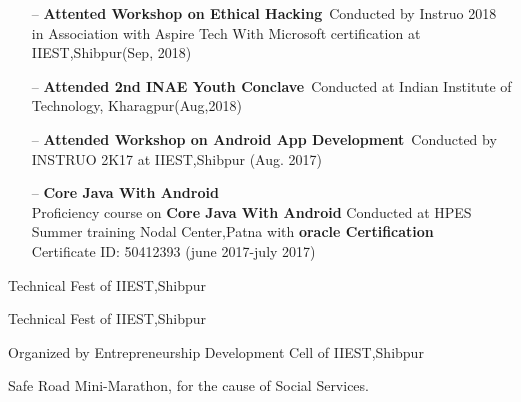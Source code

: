 
\begin{itemize}
    \item[--] \textbf{Attented Workshop on Ethical Hacking} \,Conducted by Instruo 2018 in Association with Aspire Tech With Microsoft certification  at IIEST,Shibpur(Sep, 2018)
    
    \item[--] \textbf{Attended \textbf{2nd INAE Youth Conclave}} 
    \,Conducted at Indian Institute of Technology, Kharagpur(Aug,2018)
    
    
    \item[--] \textbf{Attended Workshop on \textbf{Android App Development}}
     \,Conducted by INSTRUO 2K17 at IIEST,Shibpur (Aug. 2017)
    
    \item[--] \textbf{Core Java With Android} 
    \\Proficiency course on \textbf{Core Java With Android }Conducted at HPES Summer training Nodal Center,Patna with \textbf{oracle Certification}\\Certificate ID: 50412393 (june 2017-july 2017)
    
  
    
    
\end{itemize}





Technical Fest of IIEST,Shibpur


\divider


Technical Fest of IIEST,Shibpur


\divider


Organized by Entrepreneurship Development Cell of IIEST,Shibpur

\divider

Safe Road Mini-Marathon, for the cause of Social Services.




\\[3pt]


